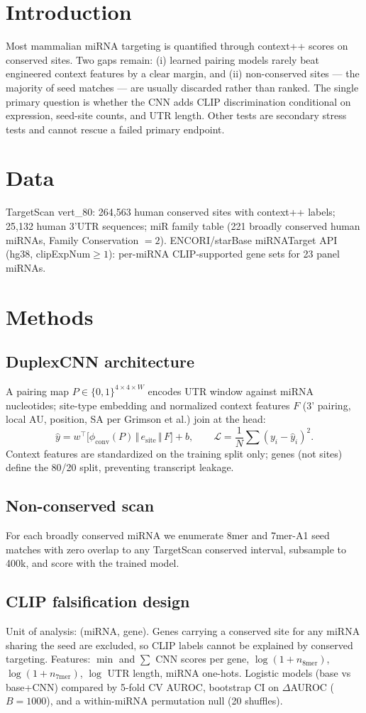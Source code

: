 \documentclass[11pt]{article}
\begin{document}
\section{Introduction}
Most mammalian miRNA targeting is quantified through context++ scores on conserved sites. Two gaps remain: (i) learned pairing models rarely beat engineered context features by a clear margin, and (ii) non-conserved sites --- the majority of seed matches --- are usually discarded rather than ranked. The single primary question is whether the CNN adds CLIP discrimination conditional on expression, seed-site counts, and UTR length. Other tests are secondary stress tests and cannot rescue a failed primary endpoint.
\section{Data}
TargetScan vert\_80: 264{,}563 human conserved sites with context++ labels; 25{,}132 human 3'UTR sequences; miR family table (221 broadly conserved human miRNAs, Family Conservation $=2$). ENCORI/starBase miRNATarget API (hg38, clipExpNum$\ge1$): per-miRNA CLIP-supported gene sets for 23 panel miRNAs.
\section{Methods}
\subsection{DuplexCNN architecture}
A pairing map $P\in\{0,1\}^{4\times 4\times W}$ encodes UTR window against miRNA nucleotides; site-type embedding and normalized context features $F$ (3' pairing, local AU, position, SA per Grimson et al.) join at the head:
\begin{equation}
\hat y = w^{\top}\big[\phi_{\mathrm{conv}}(P)\,\Vert\,e_{\mathrm{site}}\,\Vert\,F\big]+b,
\qquad \mathcal L=\frac1N\sum (y_i-\hat y_i)^2 .
\end{equation}
Context features are standardized on the training split only; genes (not sites) define the 80/20 split, preventing transcript leakage.
\subsection{Non-conserved scan}
For each broadly conserved miRNA we enumerate 8mer and 7mer-A1 seed matches with zero overlap to any TargetScan conserved interval, subsample to 400k, and score with the trained model.
\subsection{CLIP falsification design}
Unit of analysis: (miRNA, gene). Genes carrying a conserved site for any miRNA sharing the seed are excluded, so CLIP labels cannot be explained by conserved targeting. Features: $\min$ and $\sum$ CNN scores per gene, $\log(1+n_{8\mathrm{mer}})$, $\log(1+n_{7\mathrm{mer}})$, $\log$ UTR length, miRNA one-hots. Logistic models (base vs base+CNN) compared by 5-fold CV AUROC, bootstrap CI on $\Delta$AUROC ($B=1000$), and a within-miRNA permutation null (20 shuffles).
\end{document}
